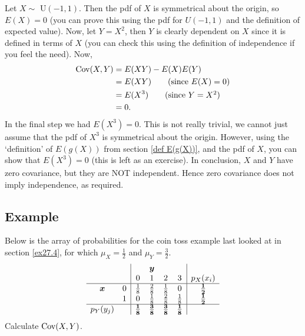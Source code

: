   	\bigskip
	
	\hfil{}
	\bigskip

\noindent Let $X \sim$ U$(-1,1)$. Then the pdf of $X$ is symmetrical about the origin, so $E(X) = 0$ (you can prove this using the pdf for $U(-1,1)$ and the definition of expected value). Now, let $Y = X^2$, then $Y$ is clearly dependent on $X$ since it is defined in terms of $X$ (you can check this using the definition of independence if you feel the need). Now,
\begin{align*}
\text{Cov}(X,Y) & = E(XY) - E(X)E(Y) \\
	& = E(XY) \tag{since $E(X) = 0$}  \\
	& = E(X^3) \tag{since $Y = X^2$} \\
	& = 0.
\end{align*}
In the final step we had $E(X^3) = 0$. This is not really trivial, we cannot just assume that the pdf of $X^3$ is symmetrical about the origin. However, using the `definition' of $E(g(X))$ from section \ref{def E(g(X))}, and the pdf of $X$, you can show that $E(X^3) = 0$ (this is left as an exercise). In conclusion, $X$ and $Y$ have zero covariance, but they are NOT independent. Hence zero covariance does not imply independence, as required.


\subsection{Example}
Below is the array of probabilities for the coin toss example last looked at in section \ref{ex27.4}, for which $\mu_X = \frac{1}{2}$ and $\mu_Y = \frac{3}{2}.$
\[
\begin{array}{cc|cccc|c} 
&& \multicolumn{3}{c}{\boldsymbol{y}} & \\
&& \multicolumn{1}{c}{0} &  \multicolumn{1}{c}{1} &  \multicolumn{1}{c}{2} &  3 & p_X(x_i) \\ \hline
$$\boldsymbol{x}$$ \multirow{3}{*}{$$} &0& \frac{1}{8} & \frac{2}{8} & \frac{1}{8} & 0 &\boldsymbol{\frac{1}{2}}  \\ 
&1&  0                 & \frac{1}{8} & \frac{2}{8} & \frac{1}{8} & \boldsymbol{\frac{1}{2}} \\ \hline
\multicolumn{1}{c}{p_Y(y_j)} &&\boldsymbol{\frac{1}{8}}&\boldsymbol{\frac{3}{8}}&\boldsymbol{\frac{3}{8}}&\boldsymbol{\frac{1}{8}}
\end{array}
\]
Calculate $\text{Cov}(X,Y)$. \\

